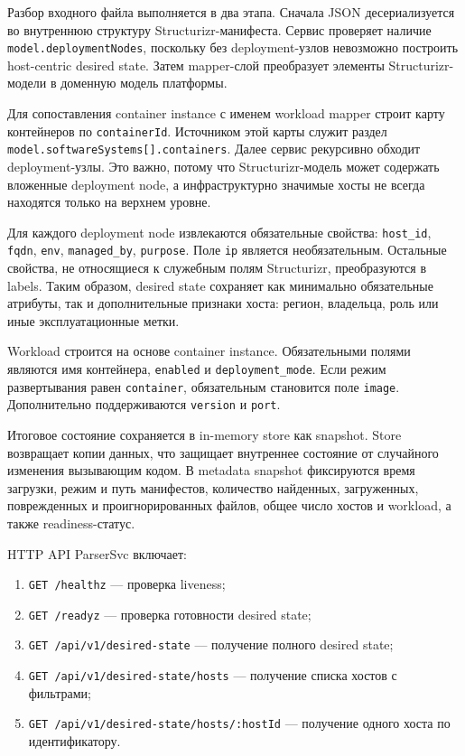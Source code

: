 Разбор входного файла выполняется в два этапа. Сначала JSON десериализуется во внутреннюю структуру Structurizr-манифеста. Сервис проверяет наличие \texttt{model.deploymentNodes}, поскольку без deployment-узлов невозможно построить host-centric desired state. Затем mapper-слой преобразует элементы Structurizr-модели в доменную модель платформы.

Для сопоставления container instance с именем workload mapper строит карту контейнеров по \texttt{containerId}. Источником этой карты служит раздел \texttt{model.softwareSystems[].containers}. Далее сервис рекурсивно обходит deployment-узлы. Это важно, потому что Structurizr-модель может содержать вложенные deployment node, а инфраструктурно значимые хосты не всегда находятся только на верхнем уровне.

Для каждого deployment node извлекаются обязательные свойства: \texttt{host\_id}, \texttt{fqdn}, \texttt{env}, \texttt{managed\_by}, \texttt{purpose}. Поле \texttt{ip} является необязательным. Остальные свойства, не относящиеся к служебным полям Structurizr, преобразуются в labels. Таким образом, desired state сохраняет как минимально обязательные атрибуты, так и дополнительные признаки хоста: регион, владельца, роль или иные эксплуатационные метки.

Workload строится на основе container instance. Обязательными полями являются имя контейнера, \texttt{enabled} и \texttt{deployment\_mode}. Если режим развертывания равен \texttt{container}, обязательным становится поле \texttt{image}. Дополнительно поддерживаются \texttt{version} и \texttt{port}.

Итоговое состояние сохраняется в in-memory store как snapshot. Store возвращает копии данных, что защищает внутреннее состояние от случайного изменения вызывающим кодом. В metadata snapshot фиксируются время загрузки, режим и путь манифестов, количество найденных, загруженных, поврежденных и проигнорированных файлов, общее число хостов и workload, а также readiness-статус.

HTTP API ParserSvc включает:
\begin{enumerate}
    \item \texttt{GET /healthz} --- проверка liveness;
    \item \texttt{GET /readyz} --- проверка готовности desired state;
    \item \texttt{GET /api/v1/desired-state} --- получение полного desired state;
    \item \texttt{GET /api/v1/desired-state/hosts} --- получение списка хостов с фильтрами;
    \item \texttt{GET /api/v1/desired-state/hosts/:hostId} --- получение одного хоста по идентификатору.
\end{enumerate}

